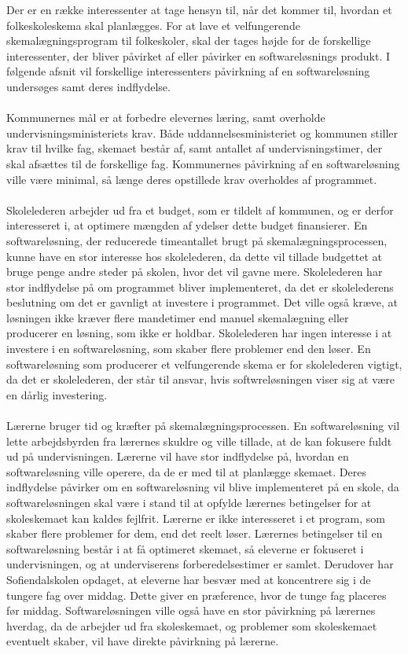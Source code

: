 Der er en række interessenter at tage hensyn til, når det kommer til, hvordan et folkeskoleskema skal planlægges. For at lave et velfungerende skemalægningsprogram til folkeskoler, skal der tages højde for de forskellige interessenter, der bliver påvirket af eller påvirker en softwareløsnings produkt. I følgende afsnit vil forskellige interessenters påvirkning af en softwareløsning undersøges samt deres indflydelse. 
\\\\
Kommunernes mål er at forbedre elevernes læring, samt overholde undervisningsministeriets krav. Både uddannelsesministeriet og kommunen stiller krav til hvilke fag, skemaet består af, samt antallet af undervisningstimer, der skal afsættes til de forskellige fag. Kommunernes påvirkning af en softwareløsning ville være minimal, så længe deres opstillede krav overholdes af programmet.
\\\\
Skolelederen arbejder ud fra et budget, som er tildelt af kommunen, og er derfor interesseret i, at optimere mængden af ydelser dette budget finansierer. En softwareløsning, der reducerede timeantallet brugt på skemalægningsprocessen, kunne have en stor interesse hos skolelederen, da dette vil tillade budgettet at bruge penge andre steder på skolen, hvor det vil gavne mere. Skolelederen har stor indflydelse på om programmet bliver implementeret, da det er skolelederens beslutning om det er gavnligt at investere i programmet. Det ville også kræve, at løsningen ikke kræver flere mandetimer end manuel skemalægning eller producerer en løsning, som ikke er holdbar. Skolelederen har ingen interesse i at investere i en softwareløsning, som skaber flere problemer end den løser. En softwareløsning som producerer et velfungerende skema er for skolelederen vigtigt, da det er skolelederen, der står til ansvar, hvis softwreløsningen viser sig at være en dårlig investering.
\\\\
Lærerne bruger tid og kræfter på skemalægningsprocessen. En softwareløsning vil lette arbejdsbyrden fra lærernes skuldre og ville tillade, at de kan fokusere fuldt ud på undervisningen. Lærerne vil have stor indflydelse på, hvordan en softwareløsning ville operere, da de er med til at planlægge skemaet. Deres indflydelse påvirker om en softwareløsning vil blive implementeret på en skole, da softwareløsningen skal være i stand til at opfylde lærernes betingelser for at skoleskemaet kan kaldes fejlfrit. Lærerne er ikke interesseret i et program, som skaber flere problemer for dem, end det reelt løser. Lærernes betingelser til en softwareløsning består i at få optimeret skemaet, så eleverne er fokuseret i undervisningen, og at underviserens forberedelsestimer er samlet. Derudover har Sofiendalskolen opdaget, at eleverne har besvær med at koncentrere sig i de tungere fag over middag. Dette giver en præference, hvor de tunge fag placeres før middag. Softwareløsningen ville også have en stor påvirkning på lærernes hverdag, da de arbejder ud fra skoleskemaet, og problemer som skoleskemaet eventuelt skaber, vil have direkte påvirkning på lærerne.
